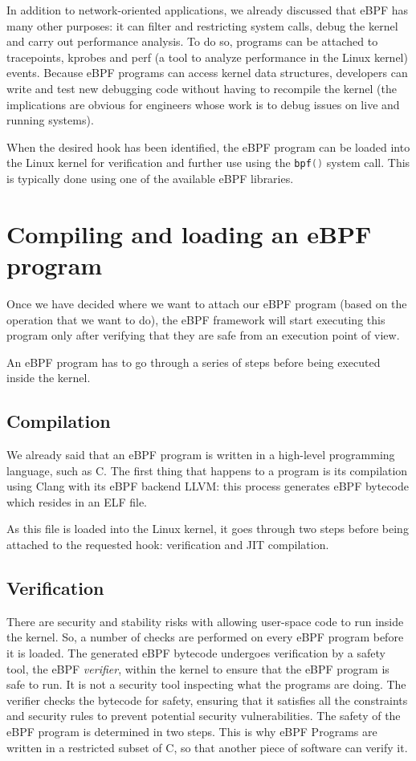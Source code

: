 In addition to network-oriented applications, we already discussed that eBPF has many other purposes: it can filter and restricting system calls, debug the kernel and carry out performance analysis.
To do so, programs can be attached to tracepoints, kprobes and perf (a tool to analyze performance in the Linux kernel) events.
Because eBPF programs can access kernel data structures, developers can write and test new debugging code without having to recompile the kernel (the implications are obvious for engineers whose work is to debug issues on live and running systems).

When the desired hook has been identified, the eBPF program can be loaded into the Linux kernel for verification and further use using the \colorbox{backcolour}{\lstinline[style=cstyle, language=C]|bpf()|} system call. 
This is typically done using one of the available eBPF libraries. 

\section{Compiling and loading an eBPF program}

Once we have decided where we want to attach our eBPF program (based on the operation that we want to do), the eBPF framework will start executing this program only after verifying that they are safe from an execution point of view. 

An eBPF program has to go through a series of steps before being executed inside the kernel.

\subsection{Compilation}

We already said that an eBPF program is written in a high-level programming language, such as C.
The first thing that happens to a program is its compilation using Clang with its eBPF backend LLVM: this process generates eBPF bytecode which resides in an ELF file.

As this file is loaded into the Linux kernel, it goes through two steps before being attached to the requested hook: verification and JIT compilation.

\subsection{Verification}

There are security and stability risks with allowing user-space code to run inside the kernel. 
So, a number of checks are performed on every eBPF program before it is loaded. 
The generated eBPF bytecode undergoes verification by a safety tool, the eBPF \textit{verifier}, within the kernel to ensure that the eBPF program is safe to run.
It is not a security tool inspecting what the programs are doing.
The verifier checks the bytecode for safety, ensuring that it satisfies all the constraints and security rules to prevent potential security vulnerabilities.
The safety of the eBPF program is determined in two steps.
This is why eBPF Programs are written in a restricted subset of C, so that another piece of software can verify it.


